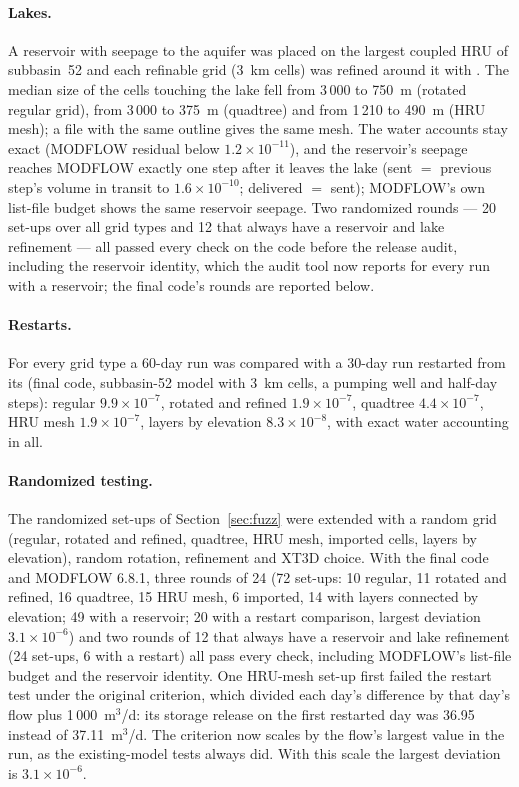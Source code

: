 \paragraph{Lakes.} A reservoir with seepage to the aquifer was placed on the largest coupled HRU of subbasin~52 and each
refinable grid (3~km cells) was refined around it with . The median size of the cells touching the lake fell from
3\,000 to 750~m (rotated regular grid), from 3\,000 to 375~m (quadtree) and from 1\,210 to 490~m (HRU mesh); a
 file with the same outline gives the same mesh. The water accounts stay exact (MODFLOW residual below
$1.2\times10^{-11}$), and the reservoir's seepage reaches MODFLOW exactly one step after it leaves the lake (sent $=$
previous step's volume in transit to $1.6\times10^{-10}$; delivered $=$ sent); MODFLOW's own list-file budget shows the same
reservoir seepage. Two randomized rounds --- 20 set-ups over all grid types and 12 that always have a reservoir and lake
refinement --- all passed every check on the code before the release audit, including the reservoir identity, which the
audit tool now reports for every run with a reservoir; the final code's rounds are reported below.

\paragraph{Restarts.} For every grid type a 60-day run was compared with a 30-day run restarted from its
 (final code, subbasin-52 model with 3~km cells, a pumping well and half-day steps): regular
$9.9\times10^{-7}$, rotated and refined $1.9\times10^{-7}$, quadtree $4.4\times10^{-7}$, HRU mesh $1.9\times10^{-7}$, layers by
elevation $8.3\times10^{-8}$, with exact water accounting in all.

\paragraph{Randomized testing.} The randomized set-ups of Section~\ref{sec:fuzz} were extended with a random grid (regular,
rotated and refined, quadtree, HRU mesh, imported cells, layers by elevation), random rotation, refinement and XT3D choice.
With the final code and MODFLOW 6.8.1, three rounds of 24 (72 set-ups: 10 regular, 11 rotated and refined, 16 quadtree, 15 HRU
mesh, 6 imported, 14 with layers connected by elevation; 49 with a reservoir; 20 with a restart comparison, largest deviation
$3.1\times10^{-6}$) and two rounds of 12 that always have a reservoir and lake refinement (24 set-ups, 6 with a restart) all pass
every check, including MODFLOW's list-file budget and the reservoir identity. One HRU-mesh set-up first failed the restart
test under the original criterion, which divided each day's difference by that day's flow plus 1\,000~m$^3$/d: its
storage release on the first restarted day was 36.95 instead of 37.11~m$^3$/d. The criterion now scales by the flow's largest
value in the run, as the existing-model tests always did. With this scale the largest deviation is $3.1\times10^{-6}$.

